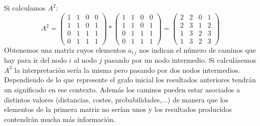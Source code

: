 \documentclass[a4paper,11pt,answers]{exam}
\begin{document}
Si calculamos $A^2$:
\[A^2 = \left(\begin{array}{rrrr}
	1&1&0&0\\
	1&1&0&1\\
	0&1&1&1\\
	0&1&1&1
\end{array}\right) * \left(\begin{array}{rrrr}
1&1&0&0\\
1&1&0&1\\
0&1&1&1\\
0&1&1&1
\end{array}\right) = \left(\begin{array}{rrrr}
2&2&0&1\\
2&3&1&2\\
1&3&2&3\\
1&3&2&3
\end{array}\right)\]
Obtenemos una matriz cuyos elementos $a_{i\,j}$ nos indican el número de caminos que hay para ir del nodo $i$ al nodo $j$
pasando por un nodo intermedio. Si calculásemos $A^3$ la interpretación sería la misma pero pasando por dos nodos intermedios.\\

Dependiendo de lo que represente el grafo inicial los resultados anteriores tendrán un significado en ese contexto. Además los caminos pueden
estar asociados a distintos valores (distancias, costes, probabilidades,...) de manera que los elementos de la primera matriz no serían
unos y los resultados producidos contendrán mucha más información.
\end{document}
